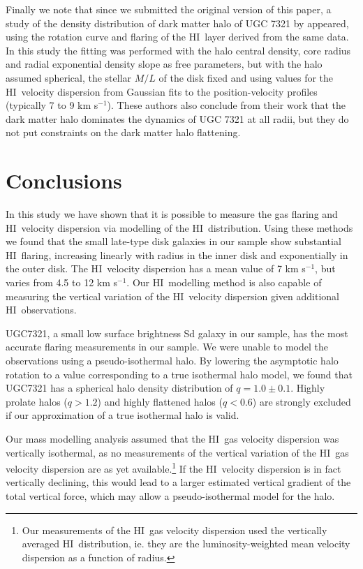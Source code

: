 \documentclass[traditabstract]{aa} %
\newcommand\HI{H{\small I}}
\newcommand\kms{km s$^{-1}$}
\begin{document}
Finally we note that since we submitted the original version of this paper,
a study of the density distribution of dark matter halo of UGC 7321 by \citet{bmj10} 
appeared, using the rotation curve and flaring of the \HI\ layer derived from the same 
data. In this study the fitting was performed with the halo central density, 
core radius and radial exponential density slope as free parameters, but with the
halo assumed spherical, the stellar $M/L$ of the disk fixed and using values for the 
\HI\ velocity dispersion from Gaussian fits to the position-velocity profiles (typically
7 to 9 \kms). These authors also conclude from their work
that the dark matter halo dominates the dynamics of UGC 7321 at all
radii, but they do not put constraints on the dark matter halo flattening.

\section{Conclusions}
\label{sec:ch7-summ}


In this study we have shown that it is possible to measure the gas
flaring and \HI\ velocity dispersion via modelling of the \HI\
distribution. Using these methods we found that the small late-type
disk galaxies in our sample show substantial \HI\ flaring, increasing
linearly with radius in the inner disk and exponentially in the
outer disk. The \HI\ velocity dispersion has a mean value of 7 \kms,
but varies from 4.5 to 12 \kms. Our \HI\ modelling method is also
capable of measuring the vertical variation of the \HI\ velocity
dispersion given additional \HI\ observations.

UGC7321, a small low surface brightness Sd galaxy in our sample,
has the most accurate flaring measurements in our sample. We were
unable to model the observations using a pseudo-isothermal halo.
By lowering the asymptotic halo rotation to a value corresponding
to a true isothermal halo model, we found that UGC7321 has a spherical
halo density distribution of $q=1.0\pm0.1$.  Highly prolate halos
($q>1.2$) and highly flattened halos ($q<0.6$) are strongly excluded
if our approximation of a true isothermal halo is valid.

Our mass modelling analysis assumed that the \HI\ gas velocity
dispersion was vertically isothermal, as no measurements of the
vertical variation of the \HI\ gas velocity dispersion are as yet
available.\footnote{Our measurements of the \HI\ gas velocity
dispersion used the vertically averaged \HI\ distribution, ie. they
are the luminosity-weighted mean velocity dispersion as a function
of radius.} If the \HI\ velocity dispersion is in fact vertically
declining, this would lead to a larger estimated vertical gradient
of the total vertical force, which may allow a pseudo-isothermal
model for the halo.
\end{document}
